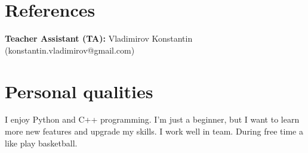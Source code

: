 \documentclass[]{resume-openfont}
\newcommand{\projectHeadingWithDate}[4]{\Project{#1}{#2}
\descript{#3 | #4}\\}
\newcommand{\teacherAssistant}[1]{\textbf{Teacher Assistant (TA):} #1}
\begin{document}
\sectionsep

  
\section{References}

\teacherAssistant Vladimirov Konstantin (konstantin.vladimirov@gmail.com)
\sectionsep

\section{Personal qualities}
I enjoy Python and C++ programming. I'm just a beginner, but I want to learn more new features and upgrade my skills. I work well in team. During free time a like play basketball.
\end{document}
